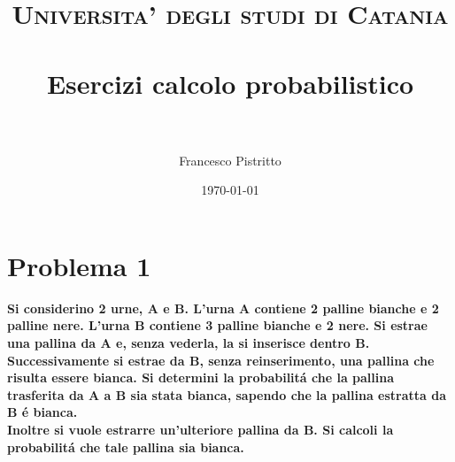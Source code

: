 \documentclass[paper=a4, fontsize=11pt]{scrartcl} %
\title{	
\normalfont \normalsize 
\textsc{Universita' degli studi di Catania} \\ [25pt] %
\horrule{0.5pt} \\[0.4cm] %
\huge Esercizi calcolo probabilistico \\ %
\horrule{2pt} \\[0.5cm] %
}
\author{Francesco Pistritto} %
\date{\normalsize\today} %
\numberwithin{equation}{section} %
\numberwithin{figure}{section} %
\numberwithin{table}{section} %
\begin{document}
\maketitle %


\section*{Problema 1}

\textbf{Si considerino 2 urne, A e B. L'urna A contiene 2 palline bianche e 2 palline nere. L'urna B contiene 3 palline bianche e 2 nere. Si estrae una pallina da A e, senza vederla, la si inserisce dentro B. Successivamente si estrae da B, senza reinserimento, una pallina che risulta essere bianca. Si determini la probabilit\'a che la pallina trasferita da A a B sia stata bianca, sapendo che la pallina estratta da B \'e bianca.\\
Inoltre si vuole estrarre un'ulteriore pallina da B. Si calcoli la probabilit\'a che tale pallina sia bianca.}

\end{document}
